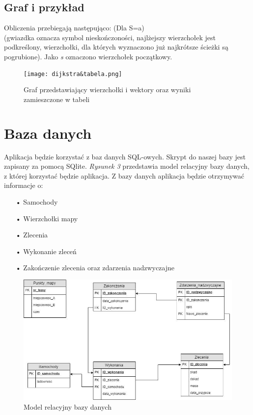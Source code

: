 \documentclass[11pt,a4paper]{mwart}
\begin{document}
\subsection{Graf i przykład}
\begin{flushleft}
Obliczenia przebiegają następująco: (Dla S=a)\\
(gwiazdka oznacza symbol nieskończoności, najlżejszy wierzchołek jest podkreślony, wierzchołki, dla których wyznaczono już najkrótsze ścieżki są pogrubione). Jako \textit{s} oznaczono wierzchołek początkowy.
\end{flushleft}
\begin{figure}[bh]
\centering
\texttt{[image: dijkstra\&tabela.png]}
\caption{Graf przedstawiający wierzchołki i wektory oraz wyniki zamieszczone w tabeli}
\end{figure}
\section{Baza danych}
Aplikacja będzie korzystać z baz danych SQL-owych. Skrypt do naszej bazy jest zapisany za pomocą SQlite. \textit{Rysunek 3} przedstawia model relacyjny bazy danych, z której korzystać będzie aplikacja.
Z bazy danych aplikacja będzie otrzymywać informacje o:
\begin{enumerate}
\item[• Samochody]
\item[• Wierzchołki mapy]
\item[• Zlecenia]
\item[• Wykonanie zleceń]
\item[• Zakończenie zlecenia oraz zdarzenia nadzwyczajne]
\end{enumerate}
\begin{figure}[th]
\centering
\includegraphics[width=\textwidth]{baza_model_relacyjny.jpg}
\caption{Model relacyjny bazy danych}
\end{figure}
\end{document}
